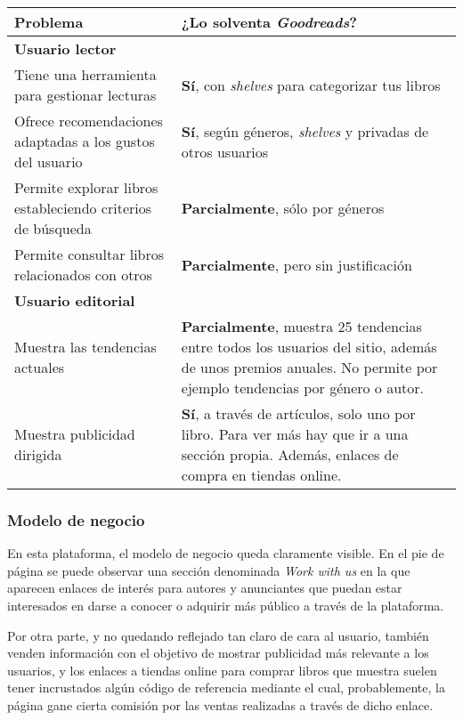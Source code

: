 \begin{table}[H]
    \begin{tabularx}{\linewidth}{|X|X|}
        \hline
        \textbf{Problema} & \textbf{¿Lo solventa \textit{Goodreads}?} \\
        \hline
        \hline
        \multicolumn{2}{|l|}{\textbf{Usuario lector}} \\
        \hline
        Tiene una herramienta para gestionar lecturas     & \textbf{Sí}, con \textit{shelves} para categorizar tus libros \\ 
        \hline
        Ofrece recomendaciones adaptadas a los gustos del usuario & \textbf{Sí}, según géneros, \textit{shelves} y privadas de otros usuarios \\ 
        \hline
        Permite explorar libros estableciendo criterios de búsqueda   & \textbf{Parcialmente}, sólo por géneros \\ 
        \hline
        Permite consultar libros relacionados con otros   & \textbf{Parcialmente}, pero sin justificación \\ 
        \hline
        \multicolumn{2}{|l|}{ \textbf{Usuario editorial}} \\
        \hline
        Muestra las tendencias actuales     & \textbf{Parcialmente}, muestra 25 tendencias entre todos los usuarios del sitio, además de unos premios anuales. No permite por ejemplo tendencias por género o autor. \\ 
        \hline
        Muestra publicidad dirigida     & \textbf{Sí}, a través de artículos, solo uno por libro. Para ver más hay que ir a una sección propia. Además, enlaces de compra en tiendas online. \\ 
        \hline
    \end{tabularx}
\end{table}

\subsubsection{Modelo de negocio}

En esta plataforma, el modelo de negocio queda claramente visible. En el pie de página se puede observar una sección denominada \textit{Work with us} en la que aparecen enlaces de interés para autores y anunciantes que puedan estar interesados en darse a conocer o adquirir más público a través de la plataforma.

Por otra parte, y no quedando reflejado tan claro de cara al usuario, también venden información con el objetivo de mostrar publicidad más relevante a los usuarios, y los enlaces a tiendas online para comprar libros que muestra suelen tener incrustados algún código de referencia mediante el cual, probablemente, la página gane cierta comisión por las ventas realizadas a través de dicho enlace.

